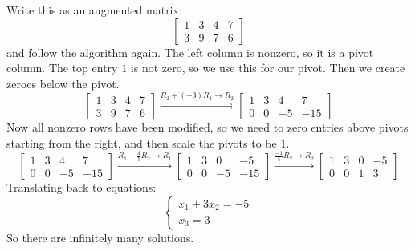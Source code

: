 \documentclass[12pt,letterpaper]{article}
\begin{document}
\begin{enumerate}
  \Answer Write this as an augmented matrix:
  \[
    \left[
      \begin{array}{ccc|c}
        1&3&4&7\\
        3&9&7&6
      \end{array}
    \right]
  \]
  and follow the algorithm again. The left column is nonzero, so it is a pivot column. The top entry $1$ is not zero, so we use this for our pivot. Then we create zeroes below the pivot. 
  \[
    \left[
      \begin{array}{ccc|c}
        1&3&4&7\\
        3&9&7&6
      \end{array}
    \right]\xrightarrow{R_2+(-3)R_1\rightarrow R_2}
    \left[
      \begin{array}{ccc|c}
        1&3&4&7\\
        0&0&-5&-15
      \end{array}
    \right]
  \]
  Now all nonzero rows have been modified, so we need to zero entries above pivots starting from the right, and then scale the pivots to be $1$.
  \[
    \left[
      \begin{array}{ccc|c}
        1&3&4&7\\
        0&0&-5&-15
      \end{array}
    \right]\xrightarrow{R_1+\frac{4}{5}R_2\rightarrow R_1}
    \left[
      \begin{array}{ccc|c}
        1&3&0&-5\\
        0&0&-5&-15
      \end{array}
    \right]\xrightarrow{\frac{-1}{5}R_2\rightarrow R_2}
    \left[
      \begin{array}{ccc|c}
        1&3&0&-5\\
        0&0&1&3
      \end{array}
    \right]
  \]
  Translating back to equations:
  \[
    \begin{cases}
      x_1+3x_2=-5\\
      x_3=3
    \end{cases}
  \]
  So there are infinitely many solutions.


\end{enumerate}
\end{document}
